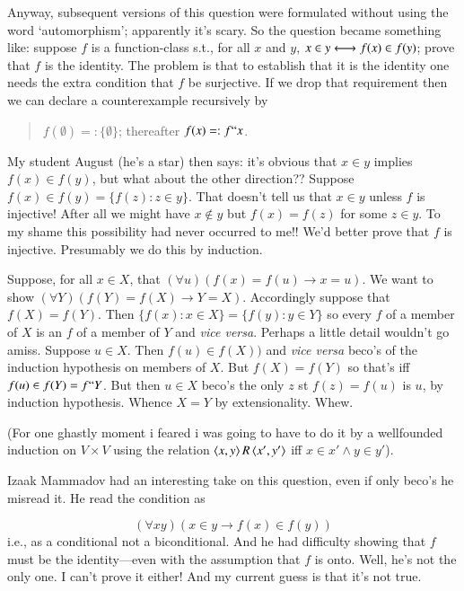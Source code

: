 \documentclass{book}
\begin{document}
Anyway, subsequent versions of this question were formulated without
using the word `automorphism'; apparently it's scary.  So the question
became something like: suppose $f$ is a function-class s.t., for all
$x$ and $y$, $x \in y \longleftrightarrow f(x) \in f(y)$; prove that $f$ is the
identity.  The problem is that to establish that it is the identity
one needs the extra condition that $f$ be surjective.  If we drop that
requirement then we can declare a counterexample recursively by
\begin{quote}
 $f(\emptyset) =: \{\emptyset\}$; thereafter $f(x) =: f``x$.
\end{quote}

My student August (he's a star) then says: it's obvious that $x \in y$
implies $f(x) \in f(y)$, but what about the other direction??  Suppose
$f(x) \in f(y) = \{f(z):z \in y\}$.  That doesn't tell us that
$x \in y$ unless $f$ is injective!  After all we might have
$x \not\in y$ but $f(x) = f(z)$ for some $z \in y$.  To my shame this
possibility had never occurred to me!!  We'd better prove that $f$ is
injective.  Presumably we do this by induction.

Suppose, for all $x \in X$, that $(\forall u)(f(x) = f(u) \to x = u)$.
We want to show $(\forall Y)(f(Y) = f(X) \to Y=X)$.  Accordingly
suppose that $f(X) = f(Y)$.  Then
$\{f(x): x \in X\} = \{f(y):y \in Y\}$ so every $f$ of a member of $X$
is an $f$ of a member of $Y$ and {\sl vice versa}.  Perhaps a little
detail wouldn't go amiss.  Suppose $u \in X$.  Then $f(u) \in f(X))$
and {\sl vice versa} beco's of the induction hypothesis on members of
$X$. But $f(X) = f(Y)$ so that's iff $f(u) \in f(Y) = f``Y$.  But then
$u \in X$ beco's the only $z$ st $f(z) = f(u)$ is $u$, by induction
hypothesis.
Whence $X = Y$ by extensionality.  Whew.

(For one ghastly moment i feared i was going to have to do it by a
wellfounded induction on $V \times V$ using the relation
$\mbox{$\langle x,y \rangle$}\,R\,\mbox{$\langle x',y' \rangle$}$ iff $x \in x' \wedge y \in y'$).
  
\bigskip

Izaak Mammadov had an interesting take on this question, even if only
beco's he misread it.  He read the condition as

$$(\forall x y)(x \in y \to f(x) \in f(y))$$
i.e., as a conditional not a biconditional.  And he had difficulty
showing that $f$ must be the identity---even with the assumption that $f$ is onto.  Well, he's not the only one.
I can't prove it either!  And my current guess is that it's not true.
\end{document}
